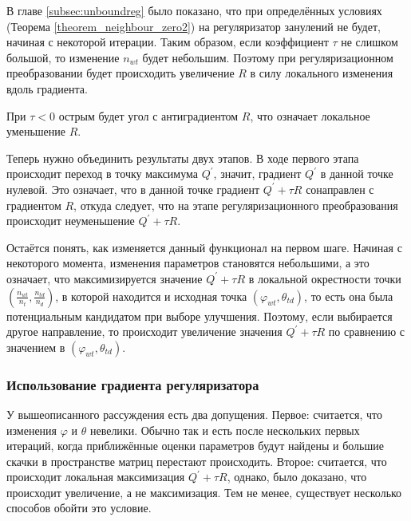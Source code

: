 \documentclass[12pt]{article}
\renewcommand{\phi}{\varphi}
\begin{document}
В главе \ref{subsec:unboundreg} было показано, что при определённых условиях (Теорема \ref{theorem_neighbour_zero2}) на регуляризатор занулений не будет, начиная с некоторой итерации. Таким образом, если коэффициент $\tau$ не слишком большой, то изменение $n_{wt}$ будет небольшим. Поэтому при регуляризационном преобразовании будет происходить увеличение $R$ в силу локального изменения вдоль градиента.

При $\tau < 0$ острым будет угол с антиградиентом $R$, что означает локальное уменьшение $R$.

Теперь нужно объединить результаты двух этапов. В ходе первого этапа происходит переход в точку максимума $Q^{\prime}$, значит, градиент $Q^{\prime}$ в данной точке нулевой. Это означает, что в данной точке градиент $Q^{\prime} + \tau R$ сонаправлен с градиентом $R$, откуда следует, что на этапе регуляризационного преобразования происходит неуменьшение $Q^{\prime} + \tau R$. 

Остаётся понять, как изменяется данный функционал на первом шаге. Начиная с некоторого момента, изменения параметров становятся небольшими, а это означает, что максимизируется значение $Q^{\prime} + \tau R$ в локальной окрестности точки $\left(\frac{n_{wt}}{n_t}, \frac{n_{td}}{n_d}\right)$, в которой находится и исходная точка $(\phi_{wt}, \theta_{td})$, то есть она была потенциальным кандидатом при выборе улучшения. Поэтому, если выбирается другое направление, то происходит увеличение значения $Q^{\prime} + \tau R$ по сравнению с значением в $(\phi_{wt}, \theta_{td})$.

\subsubsection{Использование градиента регуляризатора}
\label{subsec:gradientuse}
У вышеописанного рассуждения есть два допущения. Первое: считается, что изменения $\phi$ и $\theta$ невелики. Обычно так и есть после нескольких первых итераций, когда приближённые оценки параметров будут найдены и большие скачки в пространстве матриц перестают происходить. Второе: считается, что происходит локальная максимизация $Q^{\prime} + \tau R$, однако, было доказано, что происходит увеличение, а не максимизация. Тем не менее, существует несколько способов обойти это условие. 
\end{document}
